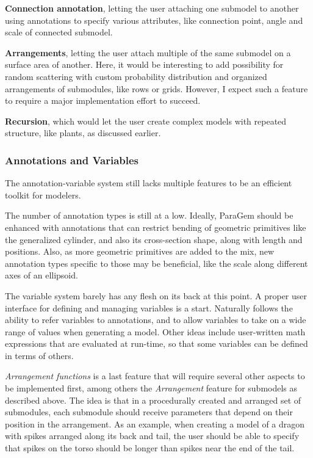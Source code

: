 \documentclass[english]{article}
\begin{document}
\textbf{Connection annotation}, letting the user attaching one submodel to another using annotations to specify various attributes, like connection point, angle and scale of connected submodel.

\textbf{Arrangements}, letting the user attach multiple of the same submodel on a surface area of another. Here, it would be interesting to add possibility for random scattering with custom probability distribution and organized arrangements of submodules, like rows or grids. However, I expect such a feature to require a major implementation effort to succeed.

\textbf{Recursion}, which would let the user create complex models with repeated structure, like plants, as discussed earlier.

\subsubsection{Annotations and Variables}


The annotation-variable system still lacks multiple features to be an efficient toolkit for modelers.

The number of annotation types is still at a low. Ideally, ParaGem should be enhanced with annotations that can restrict bending of geometric primitives like the generalized cylinder, and also its cross-section shape, along with length and positions. Also, as more geometric primitives are added to the mix, new annotation types specific to those may be beneficial, like the scale along different axes of an ellipsoid.

The variable system barely has any flesh on its back at this point. A proper user interface for defining and managing variables is a start. Naturally follows the ability to refer variables to annotations, and to allow variables to take on a wide range of values when generating a model. Other ideas include user-written math expressions that are evaluated at run-time, so that some variables can be defined in terms of others.

\textit{Arrangement functions} is a last feature that will require several other aspects to be implemented first, among others the \textit{Arrangement} feature for submodels as described above. The idea is that in a procedurally created and arranged set of submodules, each submodule should receive parameters that depend on their position in the arrangement. As an example, when creating a model of a dragon with spikes arranged along its back and tail, the user should be able to specify that spikes on the torso should be longer than spikes near the end of the tail.
\end{document}
